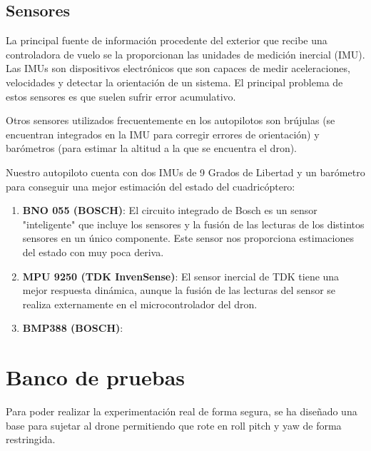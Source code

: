 \subsection{Sensores}
La principal fuente de información procedente del exterior que recibe una controladora de vuelo se la proporcionan las unidades de medición inercial (IMU). Las IMUs son dispositivos electrónicos que son capaces de medir aceleraciones, velocidades y detectar la orientación de un sistema. El principal problema de estos sensores es que suelen sufrir error acumulativo.
\\


\par Otros sensores utilizados frecuentemente en los autopilotos son brújulas (se encuentran integrados en la IMU para corregir errores de orientación) y barómetros (para estimar la altitud a la que se encuentra el dron).\\
\medskip

Nuestro autopiloto cuenta con dos IMUs de 9 Grados de Libertad y un barómetro para conseguir una mejor estimación del estado del cuadricóptero:

\begin{enumerate}
	\item \textbf{BNO 055 (BOSCH)}: El circuito integrado de Bosch es un sensor "inteligente" que incluye los sensores y la fusión de las lecturas de los distintos sensores en un único componente.
	Este sensor nos proporciona estimaciones del estado con muy poca deriva. 
	
	\item \textbf{MPU 9250 (TDK InvenSense)}: El sensor inercial de TDK tiene una mejor respuesta dinámica, aunque la fusión de las lecturas del sensor se realiza externamente en el microcontrolador del dron.
	
	\item \textbf{BMP388 (BOSCH)}:
\end{enumerate}


\section{Banco de pruebas}
Para poder realizar la experimentación real de forma segura, se ha diseñado una base para sujetar al drone permitiendo que rote en roll pitch y yaw de forma restringida.

